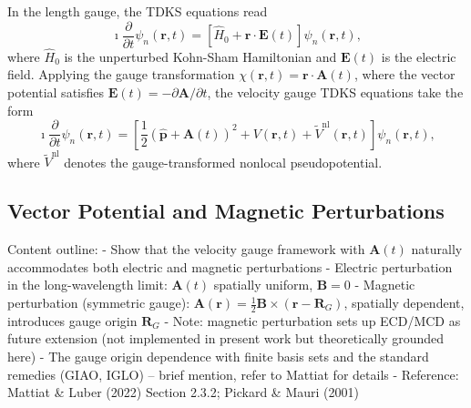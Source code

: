 In the length gauge, the TDKS equations read
\begin{equation}
  \imath \frac{\partial}{\partial t} \psi_n(\mathbf{r},t)
  = \left[ \hat{H}_0 + \mathbf{r}\cdot\mathbf{E}(t) \right]
    \psi_n(\mathbf{r},t),
  \label{eq:tdks-length}
\end{equation}
where $\hat{H}_0$ is the unperturbed Kohn-Sham Hamiltonian and
$\mathbf{E}(t)$ is the electric field.
Applying the gauge transformation $\chi(\mathbf{r},t) =
\mathbf{r}\cdot\mathbf{A}(t)$, where the vector potential satisfies
$\mathbf{E}(t) = -\partial\mathbf{A}/\partial t$,
the velocity gauge TDKS equations take the form
\begin{equation}
  \imath \frac{\partial}{\partial t} \psi_n(\mathbf{r},t)
  = \left[ \frac{1}{2}\left(\hat{\mathbf{p}} + \mathbf{A}(t)\right)^2
    + V(\mathbf{r},t) + \tilde{V}^{\mathrm{nl}}(\mathbf{r},t)
  \right] \psi_n(\mathbf{r},t),
  \label{eq:tdks-velocity}
\end{equation}
where $\tilde{V}^{\mathrm{nl}}$ denotes the gauge-transformed nonlocal
pseudopotential.\cite{Mattiat-Luber-2022,pickard-mauri-2001}


\subsection{Vector Potential and Magnetic Perturbations}
\label{sec:vector-potential}

Content outline:
- Show that the velocity gauge framework with $\mathbf{A}(t)$
  naturally accommodates both electric and magnetic perturbations
- Electric perturbation in the long-wavelength limit:
  $\mathbf{A}(t)$ spatially uniform, $\mathbf{B}=0$
- Magnetic perturbation (symmetric gauge):
  $\mathbf{A}(\mathbf{r}) = \frac{1}{2}\mathbf{B}\times(\mathbf{r}-\mathbf{R}_G)$,
  spatially dependent, introduces gauge origin $\mathbf{R}_G$
- Note: magnetic perturbation sets up ECD/MCD as future extension
  (not implemented in present work but theoretically grounded here)
- The gauge origin dependence with finite basis sets and the standard
  remedies (GIAO, IGLO) -- brief mention, refer to Mattiat for details
- Reference: Mattiat \& Luber (2022) Section 2.3.2;
  Pickard \& Mauri (2001)


